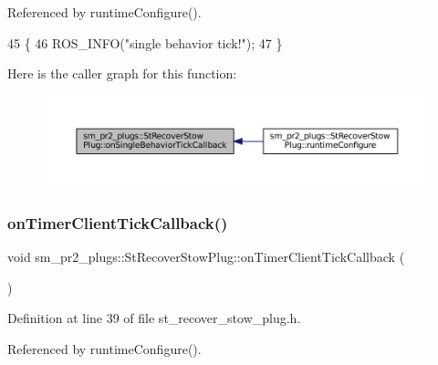 Referenced by runtime\+Configure().


\begin{DoxyCode}
45     \{
46         ROS\_INFO(\textcolor{stringliteral}{"single behavior tick!"});
47     \}
\end{DoxyCode}
Here is the caller graph for this function\+:
\nopagebreak
\begin{figure}[H]
\begin{center}
\leavevmode
\includegraphics[width=350pt]{structsm__pr2__plugs_1_1StRecoverStowPlug_af118f0e9ead8955ef7152fb8f55474ab_icgraph}
\end{center}
\end{figure}
\mbox{\label{structsm__pr2__plugs_1_1StRecoverStowPlug_adda940da8f2073a8bcf5ce4d06baccf2}} 
\subsubsection{\texorpdfstring{on\+Timer\+Client\+Tick\+Callback()}{onTimerClientTickCallback()}}
{\footnotesize\ttfamily void sm\+\_\+pr2\+\_\+plugs\+::\+St\+Recover\+Stow\+Plug\+::on\+Timer\+Client\+Tick\+Callback (\begin{DoxyParamCaption}{ }\end{DoxyParamCaption})\hspace{0.3cm}{\ttfamily [inline]}}



Definition at line 39 of file st\+\_\+recover\+\_\+stow\+\_\+plug.\+h.



Referenced by runtime\+Configure().


